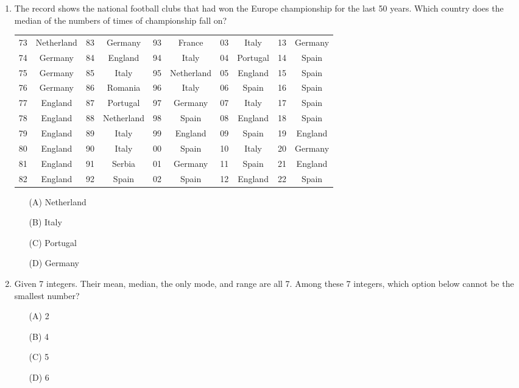 \documentclass[11pt]{scrartcl}
\begin{document}
\begin{enumerate}
\item The record shows the national football clubs that had won the Europe championship for the last 50 years. Which country does the median of the numbers of times of championship fall on?
\vspace{\baselineskip}
\begin{tabular}{cc|cc|cc|cc|cc}
\hline\hline
73 & Netherland & 83 & Germany & 93 & France & 03 & Italy & 13 & Germany\\
74 & Germany & 84 & England & 94 & Italy & 04 & Portugal & 14 & Spain\\
75 & Germany & 85 & Italy & 95 & Netherland & 05 & England & 15 & Spain\\
76 & Germany & 86 & Romania & 96 & Italy & 06 & Spain & 16 & Spain\\
77 & England & 87 & Portugal & 97 & Germany & 07 & Italy & 17 & Spain\\
78 & England & 88 & Netherland & 98 & Spain & 08 & England & 18 & Spain\\
79 & England & 89 & Italy & 99 & England & 09 & Spain & 19 & England\\
80 & England & 90 & Italy & 00 & Spain & 10 & Italy & 20 & Germany\\
81 & England & 91 & Serbia & 01 & Germany & 11 & Spain & 21 & England\\
82 & England & 92 & Spain & 02 & Spain & 12 & England & 22 & Spain\\
\hline\hline
\end{tabular}


\begin{enumerate}
\item[(A)] Netherland
\item[(B)] Italy
\item[(C)] Portugal
\item[(D)] Germany
\end{enumerate}
\vspace{4\baselineskip}


   \item Given 7 integers. Their mean, median, the only mode, and range are all 7. Among these 7 integers, which option below cannot be the smallest number?
   
   \begin{enumerate}
       \item[(A)] 2
       \item[(B)] 4
       \item[(C)] 5
       \item[(D)] 6
   \end{enumerate}
\vspace{4\baselineskip}


\end{enumerate}
\end{document}
